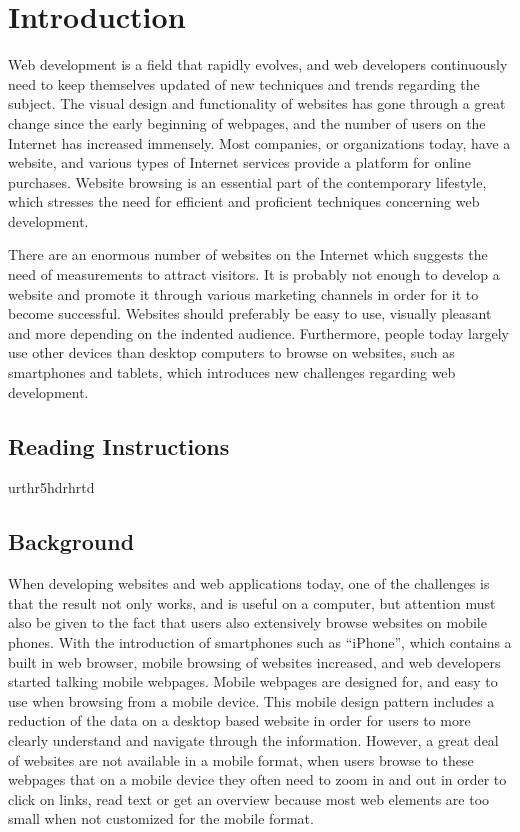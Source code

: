 \section{Introduction}

Web development is a field that rapidly evolves, and web developers continuously need to keep themselves updated of new techniques and trends regarding the subject. The visual design and functionality of websites has gone through a great change since the early beginning of webpages, and the number of users on the Internet has increased immensely. Most companies, or organizations today, have a website, and various types of Internet services provide a platform for online purchases. Website browsing is an essential part of the contemporary lifestyle, which stresses the need for efficient and proficient techniques concerning web development. 

There are an enormous number of websites on the Internet which suggests the need of measurements to attract visitors. It is probably not enough to develop a website and promote it through various marketing channels in order for it to become successful. Websites should preferably be easy to use, visually pleasant and more depending on the indented audience. Furthermore, people today largely use other devices than desktop computers to browse on websites, such as smartphones and tablets, which introduces new challenges regarding web development.



\subsection{Reading Instructions}

urthr5hdrhrtd

\subsection{Background}

When developing websites and web applications today, one of the challenges is that the result not only works, and is useful on a computer, but attention must also be given to the fact that users also extensively browse websites on mobile phones. With the introduction of smartphones such as “iPhone”, which contains a built in web browser, mobile browsing of websites increased, and web developers started talking mobile webpages. Mobile webpages are designed for, and easy to use when browsing from a mobile device. This mobile design pattern includes a reduction of the data on a desktop based website in order for users to more clearly understand and navigate through the information. However, a great deal of websites are not available in a mobile format,  when users browse to these webpages that  on a mobile device  they often need to zoom in and out in order to click on links, read text or get an overview because most web elements are too small when not customized for the mobile format. 

